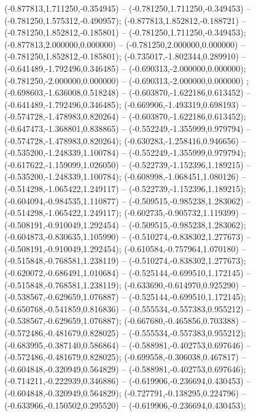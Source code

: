  (-0.877813,1.711250,-0.354945) -- (-0.781250,1.711250,-0.349453) -- (-0.781250,1.575312,-0.490957);
 (-0.877813,1.852812,-0.188721) -- (-0.781250,1.852812,-0.185801) -- (-0.781250,1.711250,-0.349453);
 (-0.877813,2.000000,0.000000) -- (-0.781250,2.000000,0.000000) -- (-0.781250,1.852812,-0.185801);
 (-0.735017,-1.802344,0.289910) -- (-0.641489,-1.792496,0.346485) -- (-0.690313,-2.000000,0.000000);
 (-0.781250,-2.000000,0.000000) -- (-0.690313,-2.000000,0.000000) ;
 (-0.698603,-1.636008,0.518248) -- (-0.603870,-1.622186,0.613452) -- (-0.641489,-1.792496,0.346485);
 (-0.669906,-1.493319,0.698193) -- (-0.574728,-1.478983,0.820264) -- (-0.603870,-1.622186,0.613452);
 (-0.647473,-1.368801,0.838865) -- (-0.552249,-1.355999,0.979794) -- (-0.574728,-1.478983,0.820264);
 (-0.630283,-1.258416,0.946656) -- (-0.535200,-1.248339,1.100784) -- (-0.552249,-1.355999,0.979794);
 (-0.617622,-1.159099,1.026050) -- (-0.522739,-1.152396,1.189215) -- (-0.535200,-1.248339,1.100784);
 (-0.608998,-1.068451,1.080126) -- (-0.514298,-1.065422,1.249117) -- (-0.522739,-1.152396,1.189215);
 (-0.604094,-0.984535,1.110877) -- (-0.509515,-0.985238,1.283062) -- (-0.514298,-1.065422,1.249117);
 (-0.602735,-0.905732,1.119399) -- (-0.508191,-0.910049,1.292454) -- (-0.509515,-0.985238,1.283062);
 (-0.604873,-0.830635,1.105990) -- (-0.510274,-0.838302,1.277673) -- (-0.508191,-0.910049,1.292454);
 (-0.610584,-0.757964,1.070180) -- (-0.515848,-0.768581,1.238119) -- (-0.510274,-0.838302,1.277673);
 (-0.620072,-0.686491,1.010684) -- (-0.525144,-0.699510,1.172145) -- (-0.515848,-0.768581,1.238119);
 (-0.633690,-0.614970,0.925290) -- (-0.538567,-0.629659,1.076887) -- (-0.525144,-0.699510,1.172145);
 (-0.650768,-0.541859,0.816836) -- (-0.555534,-0.557383,0.955212) -- (-0.538567,-0.629659,1.076887);
 (-0.667680,-0.465856,0.703388) -- (-0.572486,-0.481679,0.828025) -- (-0.555534,-0.557383,0.955212);
 (-0.683995,-0.387140,0.586864) -- (-0.588981,-0.402753,0.697646) -- (-0.572486,-0.481679,0.828025);
 (-0.699558,-0.306038,0.467817) -- (-0.604848,-0.320949,0.564829) -- (-0.588981,-0.402753,0.697646);
 (-0.714211,-0.222939,0.346886) -- (-0.619906,-0.236694,0.430453) -- (-0.604848,-0.320949,0.564829);
 (-0.727791,-0.138295,0.224796) -- (-0.633966,-0.150502,0.295520) -- (-0.619906,-0.236694,0.430453);
